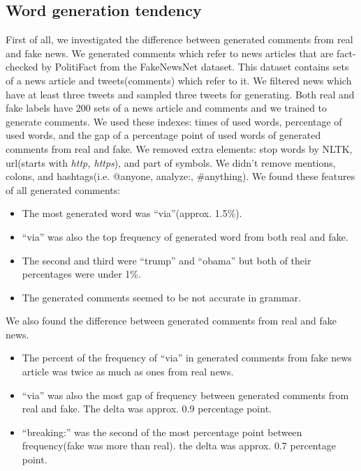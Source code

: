 \documentclass[conference]{IEEEtran}
\begin{document}
\subsection{Word generation tendency}
\label{subsec:trend}
First of all, we investigated the difference between generated comments from real and fake news.
We generated comments which refer to news articles that are fact-checked by PolitiFact from the FakeNewsNet dataset\cite{Shu2018FakeNewsNetAD}.
This dataset contains sets of a news article and tweets(comments) which refer to it.
We filtered news which have at least three tweets and sampled three tweets for generating.
Both real and fake labels have 200 sets of a news article and comments and we trained to generate comments. 
We used these indexes: times of used words, percentage of used words, and the gap of a percentage point of used words of generated comments from real and fake.
We removed extra elements: stop words by NLTK, url(starts with \textit{http, https}), and part of symbols.
We didn't remove mentions, colons, and hashtags(i.e. @anyone, analyze:, \#anything).
We found these features of all generated comments:
\begin{itemize}[]
    \item The most generated word was ``via''(approx. 1.5\%).  
    \item ``via'' was also the top frequency of generated word from both real and fake. 
    \item The second and third were ``trump'' and ``obama'' but both of their percentages were under 1\%.
    \item The generated comments seemed to be not accurate in grammar.
\end{itemize}
We also found the difference between generated comments from real and fake news.
\begin{itemize}[]
    \item The percent of the frequency of ``via'' in generated comments from fake news article was twice as much as ones from real news.
    \item ``via'' was also the most gap of frequency between generated comments from real and fake.  The delta was approx. 0.9 percentage point.
    \item ``breaking:'' was the second of the most percentage point between frequency(fake was more than real). the delta was approx. 0.7 percentage point.
\end{itemize}
\end{document}
